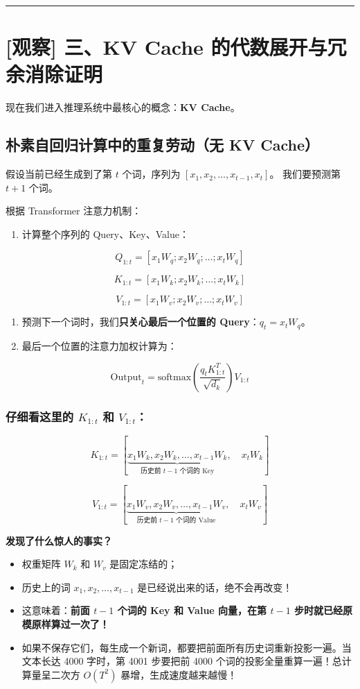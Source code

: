 \vspace{0.8em}\hrule\vspace{0.8em}

\section{[观察] 三、KV Cache 的代数展开与冗余消除证明}

现在我们进入推理系统中最核心的概念：\textbf{KV Cache}。

\subsection{朴素自回归计算中的重复劳动（无 KV Cache）}

假设当前已经生成到了第 $t$ 个词，序列为 $[x_1, x_2, \dots, x_{t-1}, x_t]$。
我们要预测第 $t+1$ 个词。

根据 Transformer 注意力机制：
\begin{enumerate}
  \item 计算整个序列的 Query、Key、Value：
\end{enumerate}

\[
Q_{1:t} = [x_1 W_q; x_2 W_q; \dots; x_t W_q]
\]

\[
K_{1:t} = [x_1 W_k; x_2 W_k; \dots; x_t W_k]
\]

\[
V_{1:t} = [x_1 W_v; x_2 W_v; \dots; x_t W_v]
\]

\begin{enumerate}
  \item 预测下一个词时，我们\textbf{只关心最后一个位置的 Query}：$q_t = x_t W_q$。
  \item 最后一个位置的注意力加权计算为：
\end{enumerate}

\[
\text{Output}_t = \text{softmax}\left(\frac{q_t K_{1:t}^T}{\sqrt{d_k}}\right) V_{1:t}
\]

\subsubsection{仔细看这里的 $K_{1:t}$ 和 $V_{1:t}$：}

\[
K_{1:t} = [ \underbrace{x_1 W_k, x_2 W_k, \dots, x_{t-1} W_k}_{\text{历史前 } t-1 \text{ 个词的 Key}}, \quad x_t W_k ]
\]

\[
V_{1:t} = [ \underbrace{x_1 W_v, x_2 W_v, \dots, x_{t-1} W_v}_{\text{历史前 } t-1 \text{ 个词的 Value}}, \quad x_t W_v ]
\]

\textbf{发现了什么惊人的事实？}
\begin{itemize}
  \item 权重矩阵 $W_k$ 和 $W_v$ 是固定冻结的；
  \item 历史上的词 $x_1, x_2, \dots, x_{t-1}$ 是已经说出来的话，绝不会再改变！
  \item 这意味着：\textbf{前面 $t-1$ 个词的 Key 和 Value 向量，在第 $t-1$ 步时就已经原模原样算过一次了！}
  \item 如果不保存它们，每生成一个新词，都要把前面所有历史词重新投影一遍。当文本长达 4000 字时，第 4001 步要把前 4000 个词的投影全量重算一遍！总计算量呈二次方 $O(T^2)$ 暴增，生成速度越来越慢！
\end{itemize}

